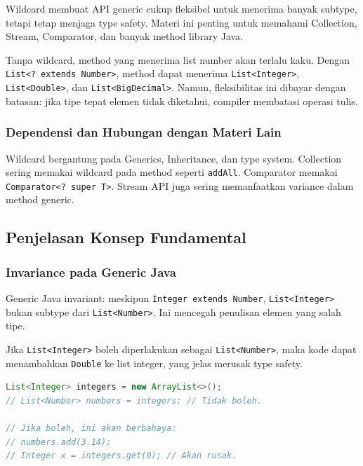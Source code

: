 \begin{jawab}
Wildcard membuat API generic cukup fleksibel untuk menerima banyak subtype, tetapi tetap menjaga type safety. Materi ini penting untuk memahami Collection, Stream, Comparator, dan banyak method library Java.
\end{jawab}

Tanpa wildcard, method yang menerima list number akan terlalu kaku. Dengan \texttt{List<? extends Number>}, method dapat menerima \texttt{List<Integer>}, \texttt{List<Double>}, dan \texttt{List<BigDecimal>}. Namun, fleksibilitas ini dibayar dengan batasan: jika tipe tepat elemen tidak diketahui, compiler membatasi operasi tulis.

\subsubsection{Dependensi dan Hubungan dengan Materi Lain}

Wildcard bergantung pada Generics, Inheritance, dan type system. Collection sering memakai wildcard pada method seperti \texttt{addAll}. Comparator memakai \texttt{Comparator<? super T>}. Stream API juga sering memanfaatkan variance dalam method generic.

\subsection{Penjelasan Konsep Fundamental}

\subsubsection{Invariance pada Generic Java}

\begin{jawab}
Generic Java invariant: meskipun \texttt{Integer extends Number}, \texttt{List<Integer>} bukan subtype dari \texttt{List<Number>}. Ini mencegah penulisan elemen yang salah tipe.
\end{jawab}

Jika \texttt{List<Integer>} boleh diperlakukan sebagai \texttt{List<Number>}, maka kode dapat menambahkan \texttt{Double} ke list integer, yang jelas merusak type safety.

\begin{lstlisting}[language=Java, caption={Alasan List<Integer> bukan List<Number>}, label={lst:generic-invariance}]
List<Integer> integers = new ArrayList<>();
// List<Number> numbers = integers; // Tidak boleh.

// Jika boleh, ini akan berbahaya:
// numbers.add(3.14);
// Integer x = integers.get(0); // Akan rusak.
\end{lstlisting}

